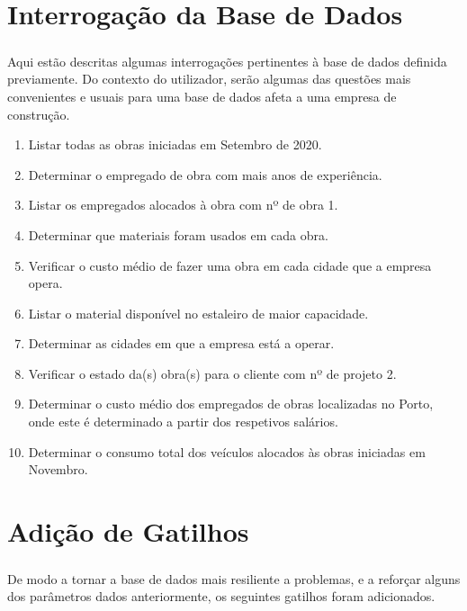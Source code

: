 \documentclass{report}
\begin{document}
	\chapter{Interrogação da Base de Dados}
		
		\paragraph{}Aqui estão descritas algumas interrogações pertinentes à base de dados
		definida previamente. Do contexto do utilizador, serão algumas das questões
		mais convenientes e usuais para uma base de dados afeta a uma empresa de construção.\\	
		
		\begin{enumerate}
			\item Listar todas as obras iniciadas em Setembro de 2020.
			\item Determinar o empregado de obra com mais anos de experiência.
			\item Listar os empregados alocados à obra com nº de obra 1.
			\item Determinar que materiais foram usados em cada obra.
			\item Verificar o custo médio de fazer uma obra em cada cidade que a empresa 
			opera.
			\item Listar o material disponível no estaleiro de maior capacidade.
			\item Determinar as cidades em que a empresa está a operar.
			\item Verificar o estado da(s) obra(s) para o cliente com nº de projeto 2.
			\item Determinar o custo médio dos empregados de obras localizadas no Porto,
			onde este é determinado a partir dos respetivos salários.
			\item Determinar o consumo total dos veículos alocados às obras iniciadas em 
			Novembro.
		\end{enumerate}		
	\chapter{Adição de Gatilhos}
		
		\paragraph{}De modo a tornar a base de dados mais resiliente a problemas, e a reforçar
		alguns dos parâmetros dados anteriormente, os seguintes gatilhos foram adicionados.
		
\end{document}
